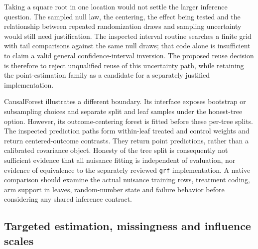 Taking a square root in one location would not settle the larger inference
question. The sampled null law, the centering, the effect being tested and
the relationship between repeated randomization draws and sampling
uncertainty would still need justification. The inspected interval routine
searches a finite grid with tail comparisons against the same null draws;
that code alone is insufficient to claim a valid general confidence-interval
inversion. The proposed reuse decision is therefore to reject unqualified
reuse of this uncertainty path, while retaining the point-estimation family
as a candidate for a separately justified implementation.
\cite{exec21_effects_causalelm}

CausalForest illustrates a different boundary. Its interface exposes
bootstrap or subsampling choices and separate split and leaf samples under
the honest-tree option. However, its outcome-centering forest is fitted
before these per-tree splits. The inspected prediction paths form
within-leaf treated and control weights and return centered-outcome
contrasts. They return point predictions, rather than a calibrated covariance
object. Honesty of the tree split is consequently not sufficient evidence
that all nuisance fitting is independent of evaluation, nor evidence of
equivalence to the separately reviewed \texttt{grf} implementation. A native
comparison should examine the actual nuisance training rows, treatment
coding, arm support in leaves, random-number state and failure behavior
before considering any shared inference contract.
\cite{exec21_effects_causalforest}

\subsection{Targeted estimation, missingness and influence scales}
\label{exec21:effects-tmle}

